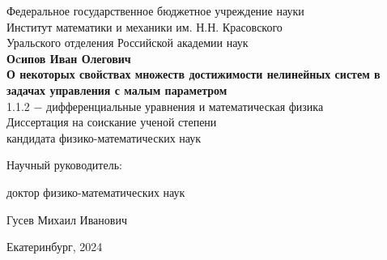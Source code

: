 \documentclass[../main.tex]{subfiles}
\begin{document}
\begin{titlepage}
    \begin{center}
        \large{Федеральное государственное бюджетное учреждение науки} \\
        \large{Институт математики и механики им. Н.Н. Красовского} \\ 
        \large{Уральского отделения Российской академии наук} \\ 
        \vspace*{4cm}
        \large{\textbf{Оcипов Иван Олегович}}\\
        \vspace*{1cm}
        \Large{\textbf{О некоторых свойствах множеств достижимости нелинейных систем в задачах управления с малым параметром}}\\
        \vspace*{1cm}
        \large{1.1.2 $-$ дифференциальные уравнения и математическая физика}\\
        \vspace*{1cm}
        \large{Диссертация на соискание ученой степени \\
        кандидата физико-математических наук}\\
    \end{center}
    \vspace*{3cm}
        
    \hspace*{82mm}\large{Научный руководитель:}

    \hspace*{82mm}\large{доктор физико-математических наук} 

    \hspace*{82mm}\large{Гусев Михаил Иванович}
        
    \vspace*{\fill}
    \begin{center}
        \large{Екатеринбург, 2024}
    \end{center}
\end{titlepage}
\end{document}
